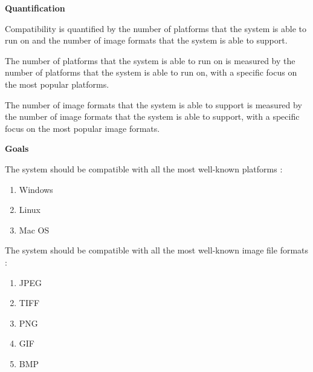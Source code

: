 \documentclass[11pt,a4paper]{article}
\begin{document}
{\bf Quantification}

Compatibility is quantified by the number of platforms that the system is able to run on and the number of image formats that the system is able to support.

The number of platforms that the system is able to run on is measured by the number of platforms that the system is able to run on, with a specific focus on the most popular platforms.

The number of image formats that the system is able to support is measured by the number of image formats that the system is able to support, with a specific focus on the most popular image formats.

{\bf Goals}

The system should be compatible with all the most well-known platforms : 
\begin{enumerate}
    \item Windows
    \item Linux
    \item Mac OS
\end{enumerate}

The system should be compatible with all the most well-known image file formats : 
\begin{enumerate}
    \item JPEG
    \item TIFF
    \item PNG
    \item GIF
    \item BMP
\end{enumerate}
\end{document}
